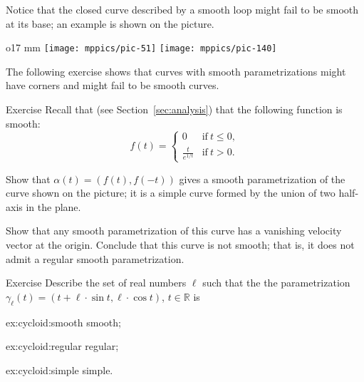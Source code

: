 Notice that the closed curve described by a smooth loop might fail to be smooth at its base; an example is shown on the picture.

\begin{wrapfigure}{o}{17 mm}
\vskip-4mm
\centering
\texttt{[image: mppics/pic-51]}
\bigskip
\texttt{[image: mppics/pic-140]}
\vskip-8mm
\end{wrapfigure}

The following exercise shows that curves with smooth parametrizations might have corners and might fail to be smooth curves.

\begin{thm}{Exercise}\label{ex:L-shape}
Recall that (see Section~\ref{sec:analysis}) that the following function is smooth: 
\[f(t)=
\begin{cases}
0&\text{if}\ t\le 0,
\\
\frac{t}{e^{1\!/\!t}}&\text{if}\ t> 0.
\end{cases}
\]

Show that $\alpha(t)=(f(t),f(-t))$ gives a smooth parametrization of the curve shown on the picture;
it is a simple curve formed by the union of two half-axis in the plane.

Show that any smooth parametrization of this curve has a vanishing velocity vector at the origin.
Conclude that this curve is not smooth;
that is, it does not admit a regular smooth parametrization.
\end{thm}


\begin{thm}{Exercise}\label{ex:cycloid}
Describe the set of real numbers $\ell$
such that the the parametrization $\gamma_\ell (t)= (t+\ell \cdot \sin t,\ell \cdot \cos t)$, $t\in\mathbb{R}$ is

\begin{minipage}{.30\textwidth}
\begin{subthm}{ex:cycloid:smooth}
smooth; 
\end{subthm}
\end{minipage}
\hfill
\begin{minipage}{.30\textwidth}
\begin{subthm}{ex:cycloid:regular}
regular;
\end{subthm}
\end{minipage}
\hfill
\begin{minipage}{.30\textwidth}
\begin{subthm}{ex:cycloid:simple}
simple.
\end{subthm}
\end{minipage}

\end{thm}

